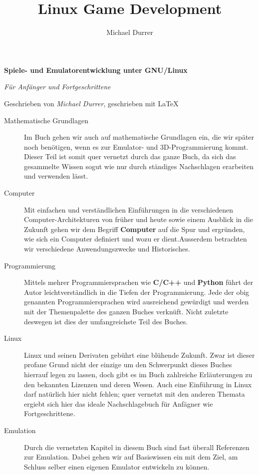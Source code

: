 \documentclass[b5paper,10pt,dvips,fleqn,titlepage,twoside]{book}
\author{Michael Durrer}
\title{Linux Game Development}
\begin{document}
\begin{titlepage}
\begin{center}
\begin{huge} \textbf{Spiele- und Emulatorentwicklung unter GNU/Linux}\end{huge}
\newline
\large
\textit{Für Anfänger und Fortgeschrittene}
\newline
\begin{small}Geschrieben von \emph{Michael Durrer}, geschrieben mit \LaTeX \newline\end{small}
\medskip
\begin{small}
\begin{description}
\item[Mathematische Grundlagen]{Im Buch gehen wir auch auf mathematische Grundlagen ein, die wir später noch benötigen, wenn es zur Emulator- und 3D-Programmierung kommt. Dieser Teil ist somit quer vernetzt durch das ganze Buch, da sich das gesammelte Wissen sogut wie nur durch ständiges Nachschlagen erarbeiten und verwenden lässt.}
 \item[Computer]{Mit einfachen und verständlichen Einführungen in die verschiedenen Computer-Architekturen von früher und heute sowie einem Ausblick in die Zukunft gehen wir dem Begriff \textbf{Computer} auf die Spur und ergründen, wie sich ein Computer definiert und wozu er dient.\newline Ausserdem betrachten wir verschiedene Anwendungszwecke und Historisches.}
\item[Programmierung]{Mittels mehrer Programmiersprachen wie \textbf{C/C++} und \textbf{Python} führt der Autor leichtverständlich in die Tiefen der Programmierung.
Jede der obig genannten Programmiersprachen wird ausreichend gewürdigt und werden mit der Themenpalette des ganzen Buches verknüft. Nicht zuletzte deswegen ist dies der umfangreichste Teil des Buches.}
\item[Linux]{Linux und seinen Derivaten gebührt eine blühende Zukunft. Zwar ist dieser profane Grund nicht der einzige um den Schwerpunkt dieses Buches hierrauf legen zu lassen, doch gibt es im Buch zahlreiche Erläuterungen zu den bekannten Lizenzen und deren Wesen. Auch eine Einführung in Linux darf natürlich hier nicht fehlen; quer vernetzt mit den anderen Themata ergiebt sich hier das ideale Nachschlagebuch für Anfägner wie Fortgeschrittene.}
\item[Emulation]{Durch die vernetzten Kapitel in diesem Buch sind fast überall Referenzen zur Emulation. Dabei gehen wir auf Basiswissen ein mit dem Ziel, am Schluss selber einen eigenen Emulator entwickeln zu können.}

\end{description}
\end{small}
\end{center}
\end{titlepage}
\end{document}
